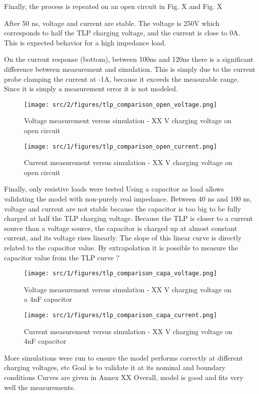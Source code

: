 Finally, the process is repeated on an open circuit in Fig. X and Fig. X

After 50 ns, voltage and current are stable.
The voltage is 250V which corresponds to half the TLP charging voltage, and the current is close to 0A.
This is expected behavior for a high impedance load.

On the current response (bottom), between 100ns and 120ns there is a significant difference between measurement and simulation.
This is simply due to the current probe clamping the current at -1A, because it exceeds the measurable range.
Since it is simply a measurement error it is not modeled.

\begin{figure}[!h]
  \centering
  \texttt{[image: src/2/figures/tlp\_comparison\_open\_voltage.png]}
  \caption{Voltage measurement versus simulation - XX V charging voltage on open circuit}
  \label{fig:comparison-tlp-1-v}
\end{figure}

\begin{figure}[!h]
  \centering
  \texttt{[image: src/1/figures/tlp\_comparison\_open\_current.png]}
  \caption{Current measurement versus simulation - XX V charging voltage on open circuit}
  \label{fig:comparison-tlp-1-i}
\end{figure}

Finally, only resistive loads were tested
Using a capacitor as load allows validating the model with non-purely real impedance.
Between 40 ns and 100 ns, voltage and current are not stable because the capacitor is too big to be fully charged at half the TLP charging voltage.
Because the TLP is closer to a current source than a voltage source, the capacitor is charged up at almost constant current, and its voltage rises linearly.
The slope of this linear curve is directly related to the capacitor value.
By extrapolation it is possible to measure the capacitor value from the TLP curve ?

\begin{figure}[!h]
  \centering
  \texttt{[image: src/1/figures/tlp\_comparison\_capa\_voltage.png]}
  \caption{Voltage measurement versus simulation - XX V charging voltage on a 4nF capacitor}
  \label{fig:comparison-tlp-capa-v}
\end{figure}

\begin{figure}[!h]
  \centering
  \texttt{[image: src/1/figures/tlp\_comparison\_capa\_current.png]}
  \caption{Current measurement versus simulation - XX V charging voltage on 4nF capacitor}
  \label{fig:comparison-tlp-capa-i}
\end{figure}

More simulations were run to ensure the model performs correctly at different charging voltages, etc
Goal is to validate it at its nominal and boundary conditions
Curves are given in Annex XX
Overall, model is good and fits very well the measurements.
